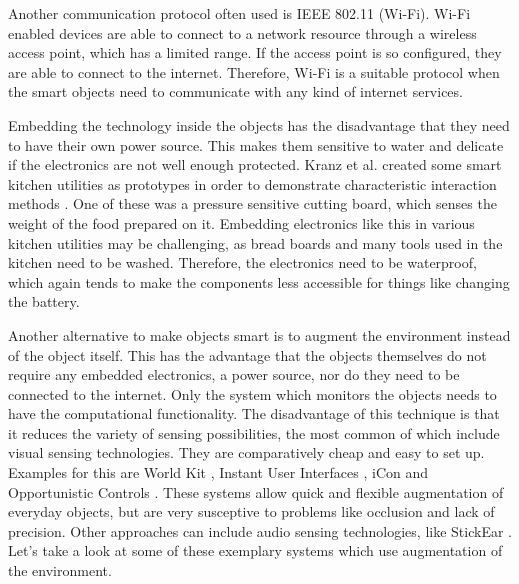 Another communication protocol often used is IEEE 802.11 (Wi-Fi).
Wi-Fi enabled devices are able to connect to a network resource through a wireless access point, which has a limited range.
If the access point is so configured, they are able to connect to the internet.
Therefore, Wi-Fi is a suitable protocol when the smart objects need to communicate with any kind of internet services.

Embedding the technology inside the objects has the disadvantage that they need to have their own power source.
This makes them sensitive to water and delicate if the electronics are not well enough protected.
Kranz et al. created some smart kitchen utilities as prototypes in order to demonstrate characteristic interaction methods \cite{kranz10}. 
One of these was a pressure sensitive cutting board, which senses the weight of the food prepared on it. 
Embedding electronics like this in various kitchen utilities may be challenging, as bread boards and many tools used in the kitchen need to be washed. 
Therefore, the electronics need to be waterproof, which again tends to make the components less accessible for things like changing the battery.

Another alternative to make objects smart is to augment the environment instead of the object itself. 
This has the advantage that the objects themselves do not require any embedded electronics, a power source, nor do they need to be connected to the internet. 
Only the system which monitors the objects needs to have the computational functionality. 
The disadvantage of this technique is that it reduces the variety of sensing possibilities, the most common of which include visual sensing technologies. 
They are comparatively cheap and easy to set up. 
Examples for this are World Kit \cite{xiao13}, Instant User Interfaces \cite{corsten13}, iCon \cite{cheng10} and Opportunistic Controls \cite{henderson08}. 
These systems allow quick and flexible augmentation of everyday objects, but are very susceptive to problems like occlusion and lack of precision.
Other approaches can include audio sensing technologies, like StickEar \cite{yeo13}. Let's take a look at some of these exemplary systems which use augmentation of the environment.

